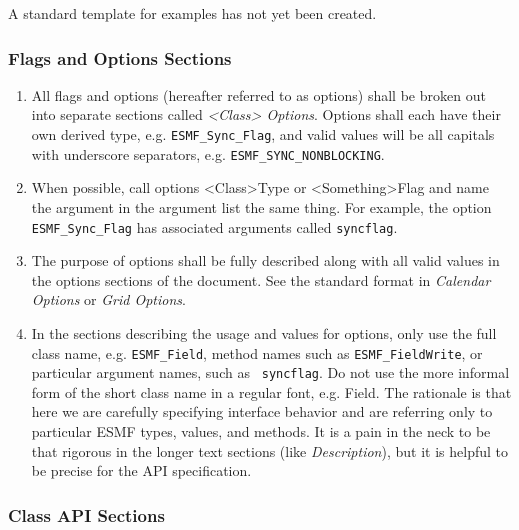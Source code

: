 A standard template for examples has not yet been created.

\subsubsection{Flags and Options Sections}

\begin{enumerate}
\item All flags and options (hereafter referred to as options) 
shall be broken out into separate sections called {\it <Class> Options}.  
Options shall each have their own derived type, 
e.g. {\tt ESMF\_Sync\_Flag}, and valid values will be all capitals
with underscore separators, e.g. {\tt ESMF\_SYNC\_NONBLOCKING}.

\item When possible, call options <Class>Type or <Something>Flag and
name the argument in the argument list the same thing.  For example,
the option {\tt ESMF\_Sync\_Flag} has associated arguments 
called {\tt syncflag}.

\item The purpose of options shall be fully described along with all 
valid values in the options sections of the document.  See the
standard format in {\it Calendar Options} or {\it Grid Options}.

\item In the sections describing the usage and values for options, 
only use the full class name, e.g. {\tt ESMF\_Field}, method names such
as {\tt ESMF\_FieldWrite}, or particular argument names, such as {\tt
syncflag}. Do not use the more informal form of the short class
name in a regular font, e.g. Field.  The rationale is that here we 
are carefully specifying interface behavior and are referring only 
to particular ESMF types, values, and methods.  It is a pain in 
the neck to be that rigorous in the longer text sections 
(like {\it Description}), but it is helpful to be precise for the 
API specification.
\end{enumerate}

\subsubsection{Class API Sections}

